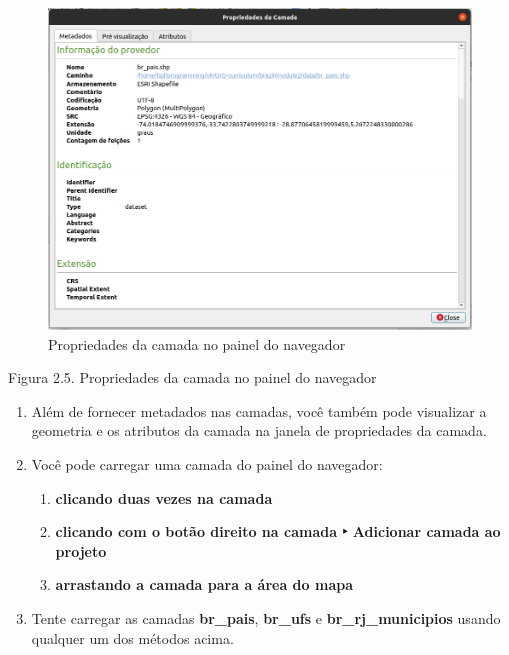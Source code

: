 \documentclass[
]{book}
\providecommand{\tightlist}{%
  \setlength{\itemsep}{0pt}\setlength{\parskip}{0pt}}
\begin{document}
\begin{figure}
\centering
\includegraphics{media/modulo2/qgis-browser-layer-properties.png}
\caption{Propriedades da camada no painel do navegador}
\end{figure}

Figura 2.5. Propriedades da camada no painel do navegador

\begin{enumerate}
\def\labelenumi{\arabic{enumi}.}
\setcounter{enumi}{7}
\item
  Além de fornecer metadados nas camadas, você também pode visualizar a geometria e os atributos da camada na janela de propriedades da camada.
\item
  Você pode carregar uma camada do painel do navegador:

  \begin{enumerate}
  \def\labelenumii{\arabic{enumii}.}
  \tightlist
  \item
    \textbf{clicando duas vezes na camada}
  \item
    \textbf{clicando com o botão direito na camada ‣ Adicionar camada ao projeto}
  \item
    \textbf{arrastando a camada para a área do mapa}
  \end{enumerate}
\item
  Tente carregar as camadas \textbf{br\_pais}, \textbf{br\_ufs} e \textbf{br\_rj\_municipios} usando qualquer um dos métodos acima.
\end{enumerate}
\end{document}
